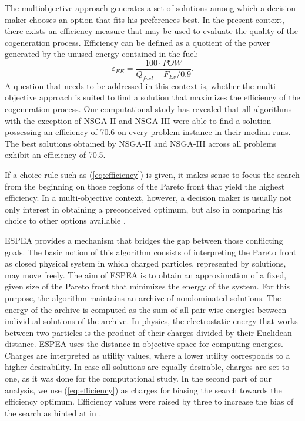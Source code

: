 The multiobjective approach generates a set of solutions among which a decision maker chooses an option that fits his preferences best. In the present context, there exists an efficiency measure that may be used to evaluate the quality of the cogeneration process. Efficiency can be defined as a quotient of the power generated by the unused energy contained in the fuel:
%
\begin{equation}
\label{eq:efficiency}
\varepsilon_{EE} = \frac{100 \cdot POW}{Q_{fuel} - F_{Ev}/0.9}.
\end{equation}
%
A question that needs to be addressed in this context is, whether the multi-objective approach is suited to find a solution that maximizes the efficiency of the cogeneration process. Our computational study has revealed that all algorithms with the exception of NSGA-II and NSGA-III were able to find a solution possessing an efficiency of 70.6 on every problem instance in their median runs. The best solutions obtained by NSGA-II and NSGA-III across all problems exhibit an efficiency of 70.5. %

If a choice rule such as (\ref{eq:efficiency}) is given, it makes sense to focus the search from the beginning on those regions of the Pareto front that yield the highest efficiency. In a multi-objective context, however, a decision maker is usually not only interest in obtaining a preconceived optimum, but also in comparing his choice to other options available \cite{roy1996multicriteria,kahneman1979prospect}.

ESPEA provides a mechanism that bridges the gap between those conflicting goals. The basic notion of this algorithm consists of interpreting the Pareto front as closed physical system in which charged particles, represented by solutions, may move freely. The aim of ESPEA is to obtain an approximation of a fixed, given size of the Pareto front that minimizes the energy of the system. For this purpose, the algorithm maintains an archive of nondominated solutions. The energy of the archive is computed as the sum of all pair-wise energies between individual solutions of the archive. In physics, the electrostatic energy that works between two particles is the product of their charges divided by their Euclidean distance. ESPEA uses the distance in objective space for computing energies. Charges are interpreted as utility values, where a lower utility corresponds to a higher desirability. In case all solutions are equally desirable, charges are set to one, as it was done for the computational study. In the second part of our analysis, we use (\ref{eq:efficiency}) as charges for biasing the search towards the efficiency optimum. Efficiency values were raised by three to increase the bias of the search as hinted at in \cite{espea}.

